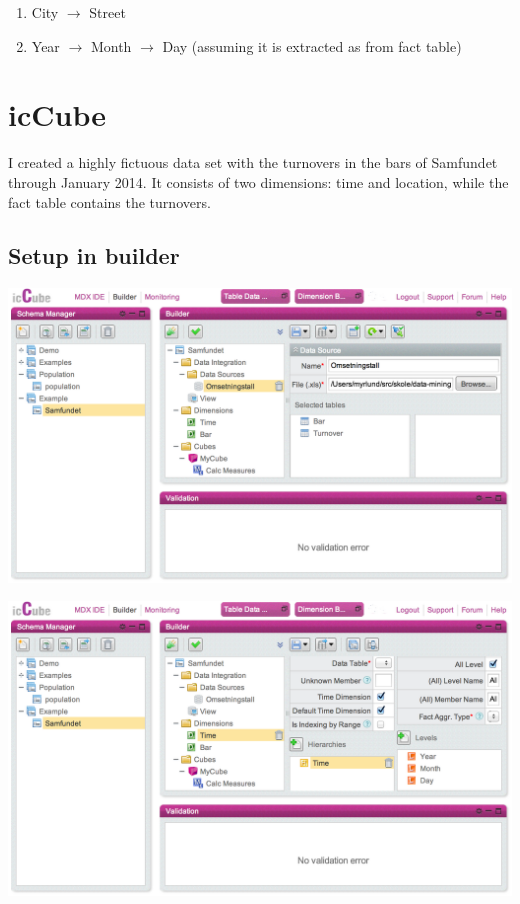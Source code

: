 \documentclass[11pt,a4paper]{article}
\begin{document}
\begin{enumerate}
  \item City $\to$ Street
  \item Year $\to$ Month $\to$ Day (assuming it is extracted as from fact table)
\end{enumerate}


\section{icCube} %
\label{sec:iccube}

I created a highly fictuous data set with the turnovers in the bars of Samfundet through January 2014.
It consists of two dimensions: time and location, while the fact table contains the turnovers.

\subsection{Setup in builder}

\includegraphics[width=\textwidth]{data_source}

\vspace{2cm}
\noindent

\includegraphics[width=\textwidth]{time_dimension}
\end{document}

